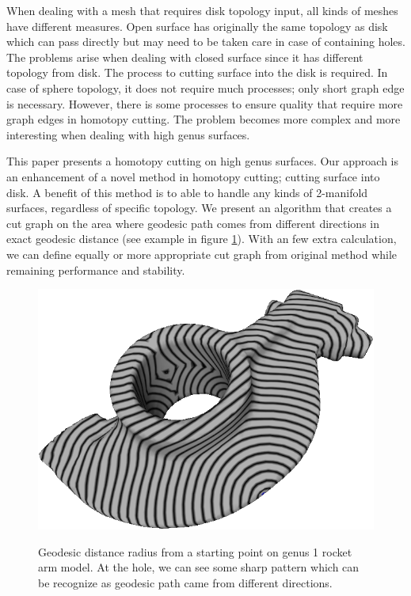 \documentclass[a4paper,twoside]{article}
\begin{document}
When dealing with a mesh that requires disk topology input, all kinds of meshes have different measures. Open surface has originally the same topology as disk which can pass directly but may need to be taken care in case of containing holes. The problems arise when dealing with closed surface since it has different topology from disk. The process to cutting surface into the disk is required. In case of sphere topology, it does not require much processes; only short graph edge is necessary. However, there is some processes to ensure quality that require more graph edges in homotopy cutting. The problem becomes more complex and more interesting when dealing with high genus surfaces. 
   
This paper presents a homotopy cutting on high genus surfaces. Our approach is an enhancement of a novel method \cite{Gu:2002:GI:566654.566589} in homotopy cutting; cutting surface into disk. A benefit of this method is to able to handle any kinds of 2-manifold surfaces, regardless of specific topology. We present an algorithm that creates a cut graph on the area where geodesic path comes from different directions in exact geodesic distance \cite{Mitchell:1987:DGP:33367.33372,Surazhsky:2005:FEA:1073204.1073228} (see example in figure \ref{fig:geodesic rocket arm}). With an few extra calculation,  we can define equally or more appropriate cut graph from original method while remaining performance and stability.
\begin{figure}[!h]
	\centering
	{\includegraphics[width=0.9\columnwidth]{images/geodesic_rocket-arm.png}}
	\caption{Geodesic distance radius from a starting point on genus 1 rocket arm model. At the hole, we can see some sharp pattern which can be recognize as geodesic path came from different directions.}
	\label{fig:geodesic rocket arm}
\end{figure}
\end{document}
